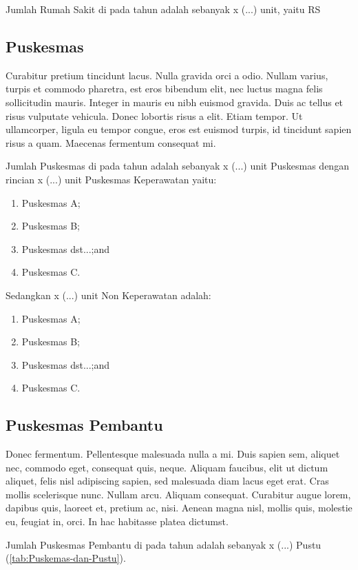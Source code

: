 Jumlah Rumah Sakit di \namaKabupaten pada tahun \tP adalah
sebanyak x (...) unit, yaitu RS

\subsection{Puskesmas}
Curabitur pretium tincidunt lacus. Nulla gravida orci a odio. Nullam varius, turpis et commodo pharetra, est eros bibendum elit, nec luctus magna felis sollicitudin mauris. Integer in mauris eu nibh euismod gravida. Duis ac tellus et risus vulputate vehicula. Donec lobortis risus a elit. Etiam tempor. Ut ullamcorper, ligula eu tempor congue, eros est euismod turpis, id tincidunt sapien risus a quam. Maecenas fermentum consequat mi.

Jumlah Puskesmas di \namaKabupaten pada tahun
\tP adalah sebanyak x (...) unit Puskesmas dengan rincian x (...)
unit Puskesmas Keperawatan yaitu:
\begin{enumerate}
  \item Puskesmas A;
  \item Puskesmas B;
  \item Puskesmas dst...;and
  \item Puskesmas C.
\end{enumerate}
Sedangkan x (...) unit Non Keperawatan adalah:
\begin{enumerate}
  \item Puskesmas A;
  \item Puskesmas B;
  \item Puskesmas dst...;and
  \item Puskesmas C.
\end{enumerate}

\subsection{Puskesmas Pembantu}

Donec fermentum. Pellentesque malesuada nulla a mi. Duis sapien sem, aliquet nec, commodo eget, consequat quis, neque. Aliquam faucibus, elit ut dictum aliquet, felis nisl adipiscing sapien, sed malesuada diam lacus eget erat. Cras mollis scelerisque nunc. Nullam arcu. Aliquam consequat. Curabitur augue lorem, dapibus quis, laoreet et, pretium ac, nisi. Aenean magna nisl, mollis quis, molestie eu, feugiat in, orci. In hac habitasse platea dictumst.

Jumlah Puskesmas Pembantu di \namaKabupaten pada tahun \tP
adalah sebanyak x (...) Pustu (\autoref{tab:Puskemas-dan-Pustu}).

